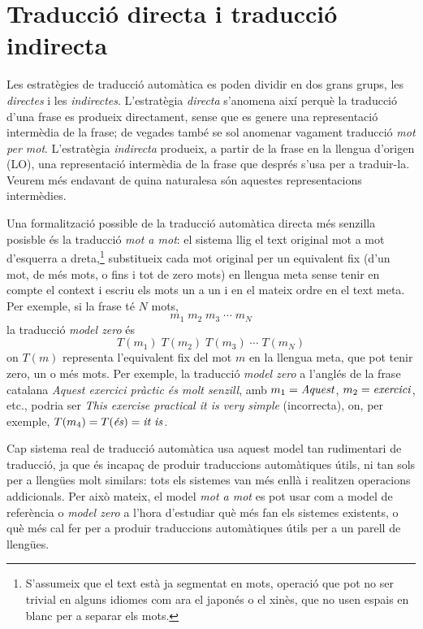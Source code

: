 \section{Traducció directa i traducció indirecta}
\label{ss:dirindir} 
Les estratègies de traducció automàtica es poden dividir en dos grans
grups, les \emph{directes} i les \emph{indirectes}. L'estratègia
\emph{directa} s'anomena així perquè la traducció d'una frase es
produeix directament, sense que es genere una representació intermèdia
de la frase; de vegades també se sol anomenar vagament traducció
\emph{mot per mot}. L'estratègia \emph{indirecta} produeix, a partir
de la frase en la llengua d'origen (LO), una representació intermèdia
de la frase que després s'usa per a traduir-la. Veurem més endavant de
quina naturalesa són aquestes representacions intermèdies.

Una formalització possible de la traducció automàtica directa més
senzilla posisble és la traducció \emph{mot a mot}: el sistema llig el
text original mot a mot d'esquerra a dreta,\footnote{S'assumeix que el
  text està ja segmentat en mots, operació que pot no ser trivial en
  alguns idiomes com ara el japonés o el xinès, que no usen espais en
  blanc per a separar els mots.} substitueix cada mot original per un
equivalent fix (d'un mot, de més mots, o fins i tot de zero mots) en
llengua meta sense tenir en compte el context i escriu els mots un a
un i en el mateix ordre en el text meta.  Per exemple, si la frase té \(N\) mots,
\begin{displaymath}
  m_1\; m_2\; m_3\; \cdots \;m_N
\end{displaymath}
la traducció \emph{model zero} és
\begin{displaymath}
  T(m_1)\; T(m_2)\; T(m_3)\; \cdots\; T(m_N)
\end{displaymath}
on \(T(m)\) representa l'equivalent fix del mot \(m\) en la llengua
meta, que pot tenir zero, un o més mots. Per exemple, la traducció
\emph{model zero} a l'anglés de la frase catalana \emph{Aquest
  exercici pràctic és molt senzill}, amb \(m_1=\mbox{\emph{Aquest}}\),
\(m_2=\mbox{\emph{exercici}}\), etc., podria ser \emph{This exercise
  practical it is very simple} (incorrecta), on, per exemple,
\(T(m_4)=T(\mbox{\emph{és}})=\mbox{\emph{it is}}\).

Cap sistema real de traducció automàtica usa aquest model tan
rudimentari de traducció, ja que és incapaç de produir traduccions
automàtiques útils, ni tan sols per a llengües molt similars: tots els
sistemes van més enllà i realitzen operacions addicionals. Per això
mateix, el model \emph{mot a mot} es pot usar com a model de
referència o \emph{model zero} a l'hora d'estudiar què més fan els
sistemes existents, o què més cal fer per a produir traduccions
automàtiques útils per a un parell de llengües.

